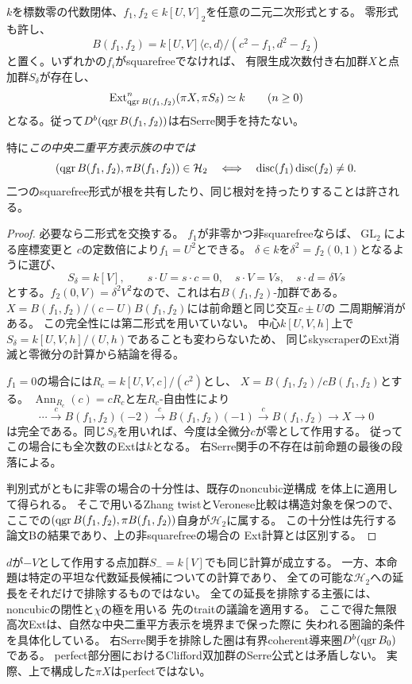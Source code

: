 \begin{corollary}[この表示族におけるsquarefree条件の必要十分性]
\label{cor:qa-double-square-degenerate-not-h2}
$k$を標数零の代数閉体、$f_1,f_2\in k[U,V]_2$を任意の二元二次形式とする。
零形式も許し、
\[
 B(f_1,f_2)=k[U,V]\langle c,d\rangle/(c^2-f_1,d^2-f_2)
\]
と置く。いずれかの$f_i$がsquarefreeでなければ、
有限生成次数付き右加群$X$と点加群$S_\delta$が存在し、
\[
 \operatorname{Ext}^n_{\operatorname{qgr} B(f_1,f_2)}(\pi X,\pi S_\delta)
 \simeq k\qquad(n\ge0)
\]
となる。従って$D^b(\operatorname{qgr} B(f_1,f_2))$は右Serre関手を持たない。

特に\emph{この中央二重平方表示族の中では}
\[
 (\operatorname{qgr} B(f_1,f_2),\pi B(f_1,f_2))\in\mathcal H_2
 \quad\Longleftrightarrow\quad
 \operatorname{disc}(f_1)\operatorname{disc}(f_2)\ne0.
\]
二つのsquarefree形式が根を共有したり、同じ根対を持ったりすることは許される。
\end{corollary}
\begin{proof}
必要なら二形式を交換する。
$f_1$が非零かつ非squarefreeならば、$\operatorname{GL}_2$による座標変更と
$c$の定数倍により$f_1=U^2$とできる。
$\delta\in k$を$\delta^2=f_2(0,1)$となるように選び、
\[
 S_\delta=k[V],\qquad
 s\cdot U=s\cdot c=0,\quad s\cdot V=Vs,\quad
 s\cdot d=\delta Vs
\]
とする。$f_2(0,V)=\delta^2V^2$なので、これは右$B(f_1,f_2)$-加群である。
$X=B(f_1,f_2)/(c-U)B(f_1,f_2)$には前命題と同じ交互$c\pm U$の
二周期解消がある。
この完全性には第二形式を用いていない。
中心$k[U,V,h]$上で$S_\delta=k[U,V,h]/(U,h)$であることも変わらないため、
同じskyscraperのExt消滅と零微分の計算から結論を得る。

$f_1=0$の場合には$R_c=k[U,V,c]/(c^2)$とし、
$X=B(f_1,f_2)/cB(f_1,f_2)$とする。
$\operatorname{Ann}_{R_c}(c)=cR_c$と左$R_c$-自由性により
\[
 \cdots\xrightarrow{\,c\,}B(f_1,f_2)(-2)
 \xrightarrow{\,c\,}B(f_1,f_2)(-1)
 \xrightarrow{\,c\,}B(f_1,f_2)
 \longrightarrow X\longrightarrow0
\]
は完全である。同じ$S_\delta$を用いれば、今度は全微分$c$が零として作用する。
従ってこの場合にも全次数のExtは$k$となる。
右Serre関手の不存在は前命題の最後の段落による。

判別式がともに非零の場合の十分性は、既存のnoncubic逆構成
\cite[\texttt{thm:noncubic-relative-effectivity}]{QuadricModuli2026}
を体上に適用して得られる。
そこで用いるZhang twistとVeronese比較は構造対象を保つので、
ここでの$(\operatorname{qgr} B(f_1,f_2),\pi B(f_1,f_2))$自身が$\mathcal H_2$に属する。
この十分性は先行する論文Bの結果であり、上の非squarefreeの場合の
Ext計算とは区別する。
\end{proof}

\begin{remark}[この境界計算の範囲]
$d$が$-V$として作用する点加群$S_-=k[V]$でも同じ計算が成立する。
一方、本命題は特定の平坦な代数延長候補についての計算であり、
全ての可能な$\mathcal H_2$への延長をそれだけで排除するものではない。
全ての延長を排除する主張には、noncubicの閉性と$\chi$の極を用いる
先のtraitの議論を適用する。
ここで得た無限高次Extは、自然な中央二重平方表示を境界まで保った際に
失われる圏論的条件を具体化している。
右Serre関手を排除した圏は有界coherent導来圏$D^b(\operatorname{qgr} B_0)$である。
perfect部分圏におけるClifford双加群のSerre公式とは矛盾しない。
実際、上で構成した$\pi X$はperfectではない。
\end{remark}
